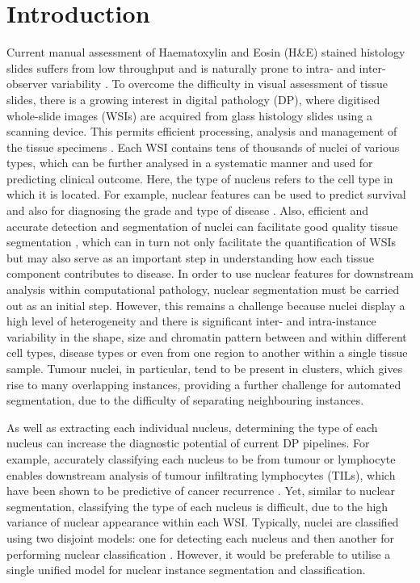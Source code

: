 \documentclass[journal]{IEEEtran}
\begin{document}
\section{Introduction} \label{section:intro}
 Current manual assessment of Haematoxylin and Eosin (H\&E) stained histology slides suffers from low throughput and is naturally prone to intra- and inter-observer variability  \cite{elmore2015diagnostic}. To overcome the difficulty in visual assessment of tissue slides, there is a growing interest in digital pathology (DP), where digitised whole-slide images (WSIs) are acquired from glass histology slides using a scanning device. This permits efficient processing, analysis and management of the tissue specimens \cite{madabhushi2016digital_pathology}. Each WSI contains tens of thousands of nuclei of various types, which can be further analysed in a systematic manner and used for predicting clinical outcome. Here, the type of nucleus refers to the cell type in which it is located. For example, nuclear features can be used to predict survival~\cite{alsubaie2018bottom} and also for diagnosing the grade and type of disease \cite{lu2018nuclear}. Also, efficient and accurate detection and segmentation of nuclei can facilitate good quality tissue segmentation \cite{sirinukunwattana2018novel, javed2018cellular}, which can in turn not only facilitate the quantification of WSIs but may also serve as an important step in understanding how each tissue component contributes to disease. In order to use nuclear features for downstream analysis within computational pathology, nuclear segmentation must be carried out as an initial step. However, this remains a challenge because nuclei display a high level of heterogeneity and there is significant inter- and intra-instance variability in the shape, size and chromatin pattern between and within different cell types, disease types or even from one region to another within a single tissue sample. Tumour nuclei, in particular, tend to be present in clusters, which gives rise to many overlapping instances, providing a further challenge for automated segmentation, due to the difficulty of separating neighbouring instances. 

    As well as extracting each individual nucleus, determining the type of each nucleus can increase the diagnostic potential of current DP pipelines. For example, accurately classifying each nucleus to be from tumour or lymphocyte enables downstream analysis of tumour infiltrating lymphocytes (TILs), which have been shown to be predictive of cancer recurrence \cite{corredor2019spatial}. Yet, similar to nuclear segmentation, classifying the type of each nucleus is difficult, due to the high variance of nuclear appearance within each WSI. Typically, nuclei are classified using two disjoint models: one for detecting each nucleus and then another for performing nuclear classification  \cite{sharma2015multi, wang2016automatic}. However, it would be preferable to utilise a single unified model for nuclear instance segmentation and classification.
    
\end{document}
